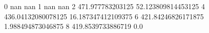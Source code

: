 0 nan nan
1 nan nan
2 471.977783203125 52.123809814453125
4 436.04132080078125 16.187347412109375
6 421.84246826171875 1.988494873046875
8 419.8539733886719 0.0
